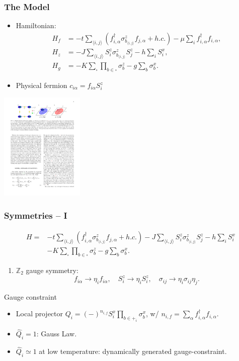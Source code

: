 \documentclass[xcolor=table, 10pt, aspectratio=43]{beamer}
\begin{document}
\begin{frame}
	\frametitle{The Model}
\begin{itemize}
\item Hamiltonian:
	\begin{align*}
	H_f &= -t\sum_{\langle i,j \rangle} (f^{\dagger}_{i,\alpha} \sigma^{z}_{b_{\langle i,j \rangle}}f_{j,\alpha} + h.c.) -\mu\sum_{i}f^{\dagger}_{i,\alpha}f_{i,\alpha}, \nonumber\\
	H_{z} &= -J \sum_{\langle i,j \rangle} S^{z}_{i} \sigma^{z}_{b_{\langle i,j \rangle}} S^{z}_{j} - h \sum_{i} S^{x}_{i}, \nonumber\\
	H_{g} &= -K \sum_{\square}\prod_{b\in\square} \sigma^{z}_{b} - g\sum_{b} \sigma^{x}_{b}.
\end{align*}
\item Physical fermion $c_{i\alpha} = f_{i\alpha}S_i^z$
\end{itemize}
\begin{center}
	\includegraphics[width=4cm]{model_l}
\end{center}
\end{frame}

\begin{frame}
\frametitle{Symmetries -- I}
\begin{align*}
	H= &-t\sum_{\langle i,j \rangle} (f^{\dagger}_{i,\alpha} \sigma^{z}_{b_{\langle i,j \rangle}}f_{j,\alpha} + h.c.)
	-J \sum_{\langle i,j \rangle} S^{z}_{i} \sigma^{z}_{b_{\langle i,j \rangle}} S^{z}_{j} - h \sum_{i} S^{x}_{i}\\
&-K \sum_{\square}\prod_{b\in\square} \sigma^{z}_{b} - g\sum_{b} \sigma^{x}_{b}.
\end{align*}
\begin{enumerate}
\item $\mathbb Z_2$ gauge symmetry:
\[f_{i\alpha}\rightarrow\eta_if_{i\alpha},
\quad S_i^z\rightarrow\eta_iS_i^z,
\quad \sigma_{ij}\rightarrow
\eta_i\sigma_{ij}\eta_j.\]
\end{enumerate}
\begin{block}{Gauge constraint}
\begin{itemize}
\item Local projector $Q_i = (-)^{n_{i,f}}S^{x}_{i}\prod_{b\in +_i}\sigma^{x}_{b}$, w/ $n_{i,f}=\sum_{\alpha}f^{\dagger}_{i,\alpha}f_{i,\alpha}$.
\item $\hat Q_i=1$: Gauss Law.
\item $\hat Q_i\simeq1$ at low temperature: dynamically generated gauge-constraint.
\end{itemize}
\end{block}
\end{frame}
\end{document}

